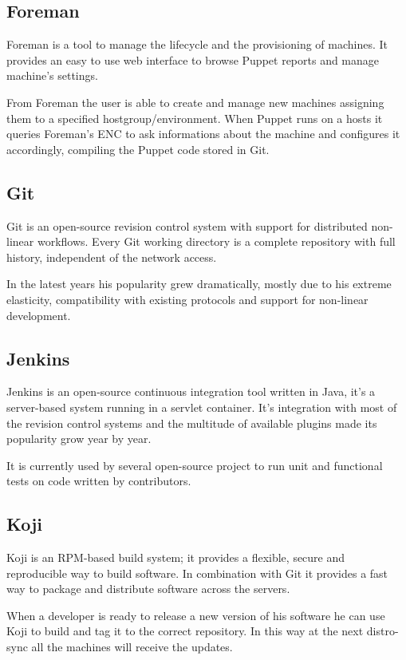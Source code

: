 \subsection{Foreman}

Foreman is a tool to manage the lifecycle and the provisioning of
machines. It provides an easy to use web interface to browse Puppet
reports and manage machine's settings.

From Foreman the user is able to create and manage new machines assigning
them to a specified hostgroup/environment. When Puppet runs on a hosts it
queries Foreman's ENC to ask informations about the machine and configures
it accordingly, compiling the Puppet code stored in Git.

\subsection{Git}

Git is an open-source revision control system with support for distributed
non-linear workflows. Every Git working directory is a complete repository
with full history, independent of the network access.

In the latest years his popularity grew dramatically, mostly due to his
extreme elasticity, compatibility with existing protocols and support for
non-linear development.

\subsection{Jenkins}

Jenkins is an open-source continuous integration tool written in Java,
it's a server-based system running in a servlet container. It's
integration with most of the revision control systems and the multitude of
available plugins made its popularity grow year by year.

It is currently used by several open-source project to run unit and
functional tests on code written by contributors.

\subsection{Koji}

Koji is an RPM-based build system; it provides a flexible, secure and
reproducible way to build software. In combination with Git it provides
a fast way to package and distribute software across the servers.

When a developer is ready to release a new version of his software he can
use Koji to build and tag it to the correct repository. In this way at the
next distro-sync all the machines will receive the updates.

